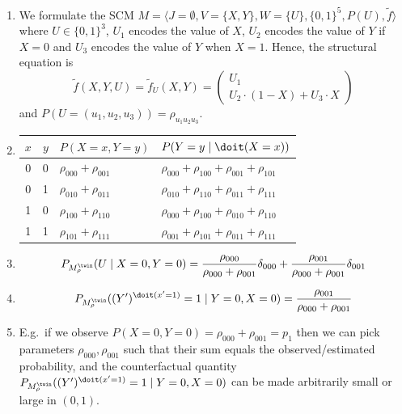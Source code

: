 \begin{enumerate}
	\begin{gradedsolution}
		\begin{enumerate}
			\item {} We formulate the SCM $M=\langle J=\emptyset, V=\{X, Y\}, W=\{U\}, \{0,1\}^5, P(U), \tilde{f} \rangle$
			where $U \in \{0,1\}^3$, $U_1$ encodes the value of $X$, $U_2$ encodes the value of $Y$ if $X=0$ and $U_3$ encodes the value of $Y$ when $X=1$. Hence, the structural equation is
			$$\tilde{f}(X, Y, U) = \tilde{f}_U(X, Y) = \begin{pmatrix}
				U_1 \\
				U_2\cdot(1-X) + U_3\cdot X
			\end{pmatrix}$$
			and $P(U=(u_1,u_2,u_3)) = \rho_{u_1u_2u_3}$.
			\item {}
			\begin{center}
				\begin{tabular}{ccll}
					$x$ & $y$ & $P(X=x, Y=y)$                   & $P(Y=y\mid\doit(X=x))$                                      \\
					\hline
					0   & 0   & $\rho_{000} + \rho_{001}$ & $\rho_{000} + \rho_{100} + \rho_{001} + \rho_{101}$ \\
					0   & 1   & $\rho_{010} + \rho_{011}$ & $\rho_{010} + \rho_{110} + \rho_{011} + \rho_{111}$ \\
					1   & 0   & $\rho_{100} + \rho_{110}$ & $\rho_{000} + \rho_{100} + \rho_{010} + \rho_{110}$ \\
					1   & 1   & $\rho_{101} + \rho_{111}$ & $\rho_{001} + \rho_{101} + \rho_{011} + \rho_{111}$
				\end{tabular}
			\end{center}
			\item {} $$P_{M_{\rho}^{\twin}}(U \mid X=0,Y=0) = \frac{\rho_{000}}{\rho_{000} + \rho_{001}} \delta_{000} + \frac{\rho_{001}}{\rho_{000} + \rho_{001}} \delta_{001}$$
			\item {} $$P_{M_{\rho}^{\twin}}((Y')^{\doit(x'=1)}=1\mid Y=0,X=0) = \frac{\rho_{001}}{\rho_{000} + \rho_{001}}$$
			\item {} E.g.\ if we observe $P(X=0,Y=0) = \rho_{000} + \rho_{001} = p_1$ then we can pick parameters $\rho_{000}, \rho_{001}$ such that their sum equals the observed/estimated probability, and the counterfactual quantity $P_{M_{\rho}^{\twin}}((Y')^{\doit(x'=1)}=1\mid Y=0,X=0)$ can be made arbitrarily small or large in $(0,1)$.
		\end{enumerate}
	\end{gradedsolution}


\end{enumerate}
